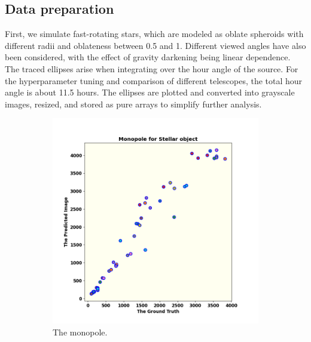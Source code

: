 \subsection{Data preparation}
First, we simulate fast-rotating stars, which are modeled as oblate spheroids with different radii and oblateness between 0.5 and 1. Different viewed angles have also been considered, with the effect of gravity darkening being linear dependence. The traced ellipses arise when integrating over the hour angle of the source. For the hyperparameter tuning and comparison of different telescopes, the total hour angle is about 11.5 hours. The ellipses are plotted and converted into grayscale images, resized, and stored as pure arrays to simplify further analysis. 
\begin{figure}
	\centering
	\begin{subfigure}{0.33\linewidth}
		\includegraphics[width=\linewidth]{fig/moments/mom0.png}
		\caption{The monopole.}
		\label{fig:mom1}
	\end{subfigure}\hfill
	\begin{subfigure}{0.33\linewidth}

\end{subfigure}
\end{figure}
